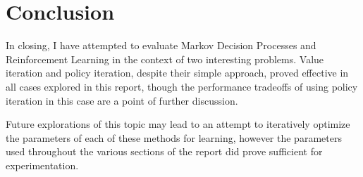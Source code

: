 \documentclass{article}
\begin{document}
  \section{Conclusion}
    In closing, I have attempted to evaluate Markov Decision Processes and Reinforcement Learning in the context of two interesting problems. Value iteration and policy iteration, despite their simple approach, proved effective in all cases explored in this report, though the performance tradeoffs of using policy iteration in this case are a point of further discussion.

    Future explorations of this topic may lead to an attempt to iteratively optimize the parameters of each of these methods for learning, however the parameters used throughout the various sections of the report did prove sufficient for experimentation. 
\end{document}
